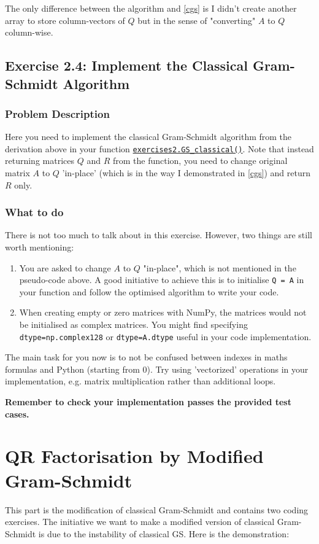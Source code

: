 \noindent The only difference between the algorithm and \autoref{cgs} is I didn't create another array to store column-vectors of \(Q\) but in the sense of "converting" \(A\)  to \(Q\)  column-wise.
\newpage
\subsection*{Exercise 2.4: Implement the Classical Gram-Schmidt Algorithm}
\subsubsection*{Problem Description}%
Here you need to implement the classical Gram-Schmidt algorithm from the derivation above in your function \href{https://comp-lin-alg.github.io/cla_utils.html#cla_utils.exercises2.GS_classical}{\texttt{exercises2.GS\_classical()}}. Note that instead returning matrices \(Q\) and \(R\) from the function, you need to change original matrix \(A\) to \(Q\) 'in-place' (which is in the way I demonstrated in \autoref{cgs}) and return \(R\) only.
\subsubsection*{What to do}
There is not too much to talk about in this exercise. However, two things are still worth mentioning:
\begin{enumerate}
  \item You are asked to change \(A\)  to \(Q\)  "in-place", which is not mentioned in the pseudo-code above. A good initiative to achieve this is to initialise \texttt{Q = A} in your function and follow the optimised algorithm to write your code. 
  \item When creating empty or zero matrices with NumPy, the matrices would not be initialised as complex matrices. You might find specifying \texttt{dtype=np.complex128} or \texttt{dtype=A.dtype} useful in your code implementation.  
\end{enumerate}
The main task for you now is to not be confused between indexes in maths formulas and Python (starting from 0). Try using 'vectorized' operations in your implementation, e.g. matrix multiplication rather than additional loops. \medskip

\noindent \textbf{Remember to check your implementation passes the provided test cases.}

\section{QR Factorisation by Modified Gram-Schmidt}
This part is the modification of classical Gram-Schmidt and contains two coding exercises. The initiative we want to make a modified version of classical Gram-Schmidt is due to the instability of classical GS. Here is the demonstration:\medskip

